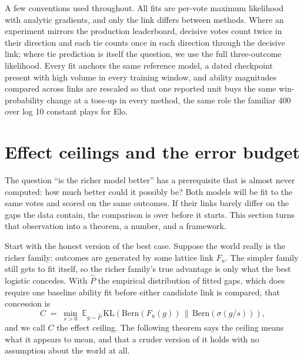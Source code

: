 \documentclass[10pt]{article}
\begin{document}
A few conventions used throughout. All fits are per-vote maximum
likelihood with analytic gradients, and only the link differs between
methods. Where an experiment mirrors the production leaderboard,
decisive votes count twice in their direction and each tie counts
once in each direction through the decisive link; where tie
prediction is itself the question, we use the full three-outcome
likelihood. Every fit anchors the same reference model, a dated
checkpoint present with high volume in every training window, and
ability magnitudes compared across links are rescaled so that one
reported unit buys the same win-probability change at a toss-up in
every method, the same role the familiar 400 over log 10 constant
plays for Elo.

\section{Effect ceilings and the error budget}\label{sec:ceiling}

The question ``is the richer model better'' has a prerequisite that
is almost never computed: how much better could it possibly be? Both
models will be fit to the same votes and scored on the same outcomes.
If their links barely differ on the gaps the data contain, the
comparison is over before it starts. This section turns that
observation into a theorem, a number, and a framework.

Start with the honest version of the best case. Suppose the world
really is the richer family: outcomes are generated by some lattice
link $F_u$. The simpler family still gets to fit itself, so the
richer family's true advantage is only what the best logistic
concedes. With $\hat P$ the empirical distribution of fitted gaps,
which does require one baseline ability fit before either candidate
link is compared, that concession is
\begin{equation}\label{eq:ceilingdef}
C \;=\; \min_{s>0}\; \mathbb{E}_{g\sim\hat P}\,
\mathrm{KL}\!\left(\mathrm{Bern}(F_u(g)) \,\big\|\,
\mathrm{Bern}(\sigma(g/s))\right),
\end{equation}
and we call $C$ the effect ceiling. The following theorem says the
ceiling means what it appears to mean, and that a cruder version of
it holds with no assumption about the world at all.
\end{document}
